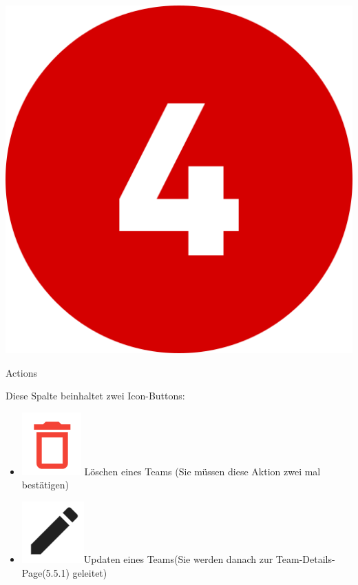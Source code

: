 \bigskip
\includegraphics[scale=0.05]{pics/user-guide/numbers/number-4.png} \begin{LARGE} Actions \end{LARGE}

Diese Spalte beinhaltet zwei Icon-Buttons:
\begin{itemize}
    \item \includegraphics[scale=0.3]{pics/user-guide/delete-icon.PNG} Löschen eines Teams (Sie müssen diese Aktion zwei mal bestätigen)
    \item \includegraphics[scale=0.3]{pics/user-guide/edit-icon.PNG}Updaten eines Teams(Sie werden danach zur Team-Details-Page(5.5.1) geleitet)
\end{itemize}

\bigskip
